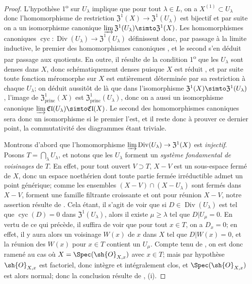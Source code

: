 \begin{proof}
L'hypothèse 1\textsuperscript{o} sur $U_\lambda$ implique que pour tout $\lambda\in L$, on a $X^{(1)}\subset U_\lambda$  donc l'homomorphisme de restriction $\mathfrak{Z}^1(X)\to\mathfrak{Z}^1(U_\lambda)$ est bijectif et par suite on a un isomorphisme canonique $\varinjlim\mathfrak{Z}^1(U_\lambda)\simto\mathfrak{Z}^1(X)$.
Les homomorphismes canoniques $\operatorname{cyc}:\operatorname{Div}(U_\lambda)\to\mathfrak{Z}^1(U_\lambda)$ définissent donc, par passage à la limite inductive, le premier des homomorphismes canoniques , et le second s'en déduit par passage aux quotients.
En outre, il résulte de la condition 1\textsuperscript{o} que les $U_\lambda$ sont denses dans $X$, donc schématiquement denses puisque $X$ est réduit , et par suite toute fonction méromorphe sur $X$ est entièrement déterminée par sa restriction à chaque $U_\lambda$;
on déduit aussitôt de là que dans l'isomorphisme $\mathfrak{Z}^1(X)\simto\mathfrak{Z}^1(U_\lambda)$, l'image de $\mathfrak{Z}^1_\mathrm{princ}(X)$ est $\mathfrak{Z}^1_\mathrm{princ}(U_\lambda)$, donc on a aussi un isomorphisme canonique $\varinjlim\mathfrak{Cl}(U_\lambda)\simto\mathfrak{Cl}(X)$.
Le second des homomorphismes canoniques  sera donc un isomorphisme si le premier l'est, et il reste donc à prouver ce dernier point, la commutativité des diagrammes  étant triviale.

Montrons d'abord que l'homomorphisme $\varinjlim\operatorname{Div}(U_\lambda)\to\mathfrak{Z}^1(X)$ est \emph{injectif}.
Posons $T=\bigcap_\lambda U_\lambda$, et notons que les $U_\lambda$ forment un \emph{système fondamental de voisinages} de $T$.
En effet, pour tout ouvert $V\supset T$, $X-V$ est un sous-espace fermé de $X$, donc un espace noethérien dont toute partie fermée irréductible admet un point générique;
comme les ensembles $(X-V)\cap(X-U_\lambda)$ sont fermés dans $X-V$, forment une famille filtrante croissante et ont pour réunion $X-V$, notre assertion résulte de .
Cela étant, il s'agit de voir que si $D\in\operatorname{Div}(U_\lambda)$ est tel que $\operatorname{cyc}(D)=0$ dans $\mathfrak{Z}^1(U_\lambda)$, alors il existe $\mu\geq\lambda$ tel que $D|U_\mu=0$.
En vertu de ce qui précède, il suffira de voir que pour tout $x\in T$, on a $D_x=0$;
en effet, il y aura alors un voisinage $W(x)$ de $x$ dans $X$ tel que $D|W(x)=0$, et la réunion des $W(x)$ pour $x\in T$ contient un $U_\mu$.
Compte tenu de , on est donc ramené au cas où $X=\Spec(\sh{O}_{X,x})$ avec $x\in T$;
mais par hypothèse $\sh{O}_{X,x}$ est factoriel, donc intègre et intégralement clos, et $\Spec(\sh{O}_{X,x})$ est alors normal;
donc la conclusion résulte de , (i).


\end{proof}
